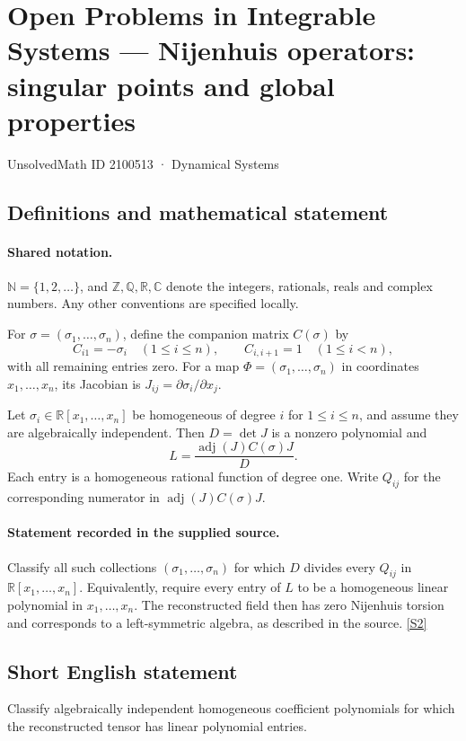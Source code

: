 \documentclass[11pt]{article}
\newcommand{\sref}[2]{\hyperlink{source:#1:#2}{[S#2]}}
\begin{document}
\setcounter{section}{2100512}
\section{Open Problems in Integrable Systems — Nijenhuis operators: singular points and global properties}\label{2100513}
{\small\sffamily UnsolvedMath ID 2100513 · Dynamical Systems}
\subsection{Definitions and mathematical statement}

\paragraph{Shared notation.}$\mathbb N=\{1,2,\ldots\}$, and $\mathbb Z,\mathbb Q,\mathbb R,\mathbb C$ denote the integers, rationals, reals and complex numbers. Any other conventions are specified locally.


For $\sigma=(\sigma_1,\ldots,\sigma_n)$, define the companion matrix $C(\sigma)$ by
\[ C_{i1}=-\sigma_i\quad(1\leq i\leq n),\qquad C_{i,i+1}=1\quad(1\leq i<n), \]
with all remaining entries zero. For a map $\Phi=(\sigma_1,\ldots,\sigma_n)$ in coordinates $x_1,\ldots,x_n$, its Jacobian is $J_{ij}=\partial\sigma_i/\partial x_j$.\par Let $\sigma_i\in\mathbb R[x_1,\ldots,x_n]$ be homogeneous of degree $i$ for $1\leq i\leq n$, and assume they are algebraically independent. Then $D=\det J$ is a nonzero polynomial and
\[ L=\frac{\operatorname{adj}(J)C(\sigma)J}{D}. \]
Each entry is a homogeneous rational function of degree one. Write $Q_{ij}$ for the corresponding numerator in $\operatorname{adj}(J)C(\sigma)J$.
\paragraph{Statement recorded in the supplied source.}
Classify all such collections $(\sigma_1,\ldots,\sigma_n)$ for which $D$ divides every $Q_{ij}$ in $\mathbb R[x_1,\ldots,x_n]$. Equivalently, require every entry of $L$ to be a homogeneous linear polynomial in $x_1,\ldots,x_n$. The reconstructed field then has zero Nijenhuis torsion and corresponds to a left-symmetric algebra, as described in the source. \sref{2100513}{2}
\subsection{Short English statement}
Classify algebraically independent homogeneous coefficient polynomials for which the reconstructed tensor has linear polynomial entries.
\end{document}
